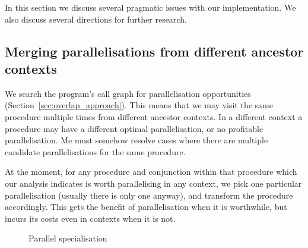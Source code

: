 
In this section we discuss several pragmatic issues with our implementation.
We also discuss several directions for further research.



\subsection{Merging parallelisations from different ancestor contexts}
\label{sec:overlap_pragma_merge}

We search the program's
call graph for parallelisation opportunities
(Section~\ref{sec:overlap_approach}).
This means that we may visit the same procedure multiple times from
different ancestor contexts.
In a different context a procedure may have a different optimal
parallelisation,
or no profitable parallelisation.
Me must somehow resolve cases where there are multiple candidate
parallelisations for the same procedure.

At the moment, for any procedure and conjunction within that procedure
which our analysis indicates is worth parallelising in any context,
we pick one particular parallelisation (usually there is only one anyway),
and transform the procedure accordingly.
This gets the benefit of parallelisation when it is worthwhile,
but incurs its costs even in contexts when it is not.

\begin{figure}
\begin{center}
\end{center}
\caption{Parallel specialisation}
\label{fig:par_specialisation}
\end{figure}

